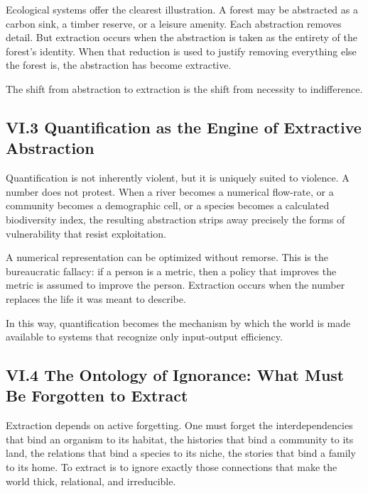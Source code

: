\documentclass[12pt,letterpaper]{article}
\begin{document}
Ecological systems offer the clearest illustration. A forest may be abstracted as a carbon sink, a timber reserve, or a leisure amenity. Each abstraction removes detail. But extraction occurs when the abstraction is taken as the entirety of the forest’s identity. When that reduction is used to justify removing everything else the forest is, the abstraction has become extractive.

The shift from abstraction to extraction is the shift from necessity to indifference.

\subsection{VI.3 Quantification as the Engine of Extractive Abstraction}

Quantification is not inherently violent, but it is uniquely suited to violence. A number does not protest. When a river becomes a numerical flow-rate, or a community becomes a demographic cell, or a species becomes a calculated biodiversity index, the resulting abstraction strips away precisely the forms of vulnerability that resist exploitation.

A numerical representation can be optimized without remorse. This is the bureaucratic fallacy: if a person is a metric, then a policy that improves the metric is assumed to improve the person. Extraction occurs when the number replaces the life it was meant to describe.

In this way, quantification becomes the mechanism by which the world is made available to systems that recognize only input-output efficiency.

\subsection{VI.4 The Ontology of Ignorance: What Must Be Forgotten to Extract}

Extraction depends on active forgetting. One must forget the interdependencies that bind an organism to its habitat, the histories that bind a community to its land, the relations that bind a species to its niche, the stories that bind a family to its home. To extract is to ignore exactly those connections that make the world thick, relational, and irreducible.
\end{document}
